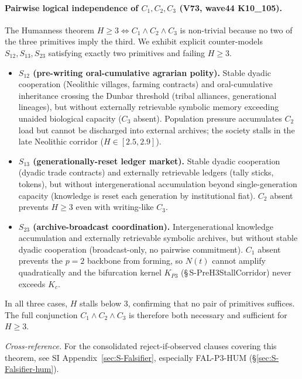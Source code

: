 \documentclass[11pt]{article}
\begin{document}
\paragraph{Pairwise logical independence of $C_1, C_2, C_3$ (V73, wave44 K10\_105).}\label{S-HumannessPairwiseIndependence}
The Humanness theorem $H\!\ge\!3\Leftrightarrow C_1\wedge C_2\wedge C_3$ is non-trivial because no two of the three primitives imply the third. We exhibit explicit counter-models $S_{12}, S_{13}, S_{23}$ satisfying exactly two primitives and failing $H\!\ge\!3$.
\begin{itemize}\setlength\itemsep{0.1em}
  \item \textbf{$S_{12}$ (pre-writing oral-cumulative agrarian polity).} Stable dyadic cooperation (Neolithic villages, farming contracts) and oral-cumulative inheritance crossing the Dunbar threshold (tribal alliances, generational lineages), but without externally retrievable symbolic memory exceeding unaided biological capacity ($C_3$ absent). Population pressure accumulates $C_2$ load but cannot be discharged into external archives; the society stalls in the late Neolithic corridor ($H\in[2.5,2.9]$).
  \item \textbf{$S_{13}$ (generationally-reset ledger market).} Stable dyadic cooperation (dyadic trade contracts) and externally retrievable ledgers (tally sticks, tokens), but without intergenerational accumulation beyond single-generation capacity (knowledge is reset each generation by institutional fiat). $C_2$ absent prevents $H\!\ge\!3$ even with writing-like $C_3$.
  \item \textbf{$S_{23}$ (archive-broadcast coordination).} Intergenerational knowledge accumulation and externally retrievable symbolic archives, but without stable dyadic cooperation (broadcast-only, no pairwise commitment). $C_1$ absent prevents the $p{=}2$ backbone from forming, so $N(t)$ cannot amplify quadratically and the bifurcation kernel $K_{P3}$ (\S\,S-PreH3StallCorridor) never exceeds $K_c$.
\end{itemize}
In all three cases, $H$ stalls below 3, confirming that no pair of primitives suffices. The full conjunction $C_1\wedge C_2\wedge C_3$ is therefore both necessary and sufficient for $H\!\ge\!3$.


\medskip\noindent\emph{Cross-reference.} For the consolidated reject-if-observed clauses covering this theorem, see SI Appendix~\ref{sec:S-Falsifier}, especially FAL-P3-HUM (\S\ref{sec:S-Falsifier-hum}).
\end{document}

